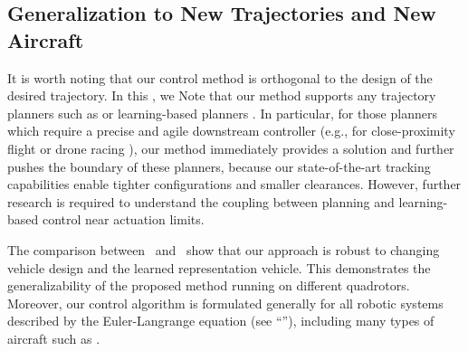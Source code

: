\subsection*{Generalization to New Trajectories and New Aircraft}
It is worth noting that our control method is orthogonal to the design of the desired trajectory. In this , we  Note that our method supports any trajectory planners such as \cite{foehn2021time} or learning-based planners \cite{nakka2020chance,doi:10.1126/scirobotics.abg5810,liu2020robust}. In particular, for those planners which require a precise and agile downstream controller (e.g., for close-proximity flight or drone racing \cite{foehn2021time,shi2021neural}), our method immediately provides a solution and further pushes the boundary of these planners, because our state-of-the-art tracking capabilities enable tighter configurations and smaller clearances. However, further research is required to understand the coupling between planning and learning-based control near actuation limits. 

The comparison between \nf~and \nftransfer~show that our approach is robust to changing vehicle design and the learned representation  vehicle. This demonstrates the generalizability of the proposed method running on different quadrotors. Moreover, our control algorithm is formulated generally for all robotic systems described by the Euler-Langrange equation (see ``''), including many types of aircraft such as \cite{shi_adaptive_2020,doi:10.1126/scirobotics.abf8136}. 